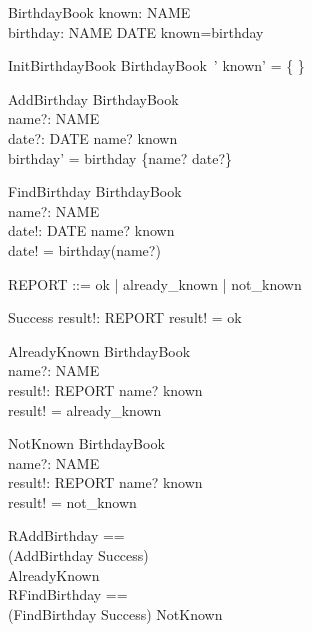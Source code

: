 \documentclass{article}
\begin{document}
\begin{zed}
\end{zed}

\begin{schema}{BirthdayBook}
known: \power NAME \\ 
birthday: NAME \pfun DATE 
\where 
	known=\dom birthday
\end{schema}

\begin{schema}{InitBirthdayBook} 
BirthdayBook~' 
\where 
	known' = \{ \}
\end{schema}

\begin{schema}{AddBirthday}
    \Delta BirthdayBook \\
    name?: NAME \\
    date?: DATE
\where
    name? \notin known\\
    birthday' = birthday \cup \{name? \mapsto date?\}
\end{schema}

\begin{schema}{FindBirthday}
    \Xi BirthdayBook \\
    name?: NAME \\
    date!: DATE 
\where
    	name? \in known\\
    	date! = birthday(name?)
\end{schema}

\begin{zed} 
    REPORT ::= ok | already\_known | not\_known
\end{zed}

\begin{schema}{Success}
    result!: REPORT
\where
    result! = ok
\end{schema}

\begin{schema}{AlreadyKnown}
    \Xi BirthdayBook \\
    name?: NAME \\
    result!: REPORT
\where
	name? \in known \\
	result! = already\_known
\end{schema}

\begin{schema}{NotKnown}
    \Xi BirthdayBook \\
    name?: NAME \\
    result!: REPORT
\where
	name? \notin known \\
	result! = not\_known
\end{schema}

\begin{zed} 
    RAddBirthday ==\\ (AddBirthday \land Success)\\
      \lor AlreadyKnown \\
    RFindBirthday ==\\ (FindBirthday \land Success)
     \lor NotKnown \\
\end{zed}
\end{document}
